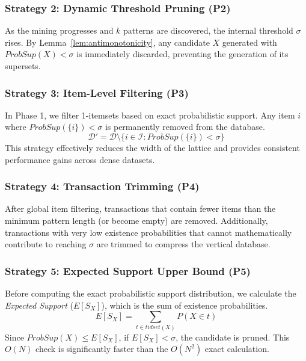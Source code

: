 \documentclass[10pt,letterpaper]{article}
\begin{document}
\subsubsection*{Strategy 2: Dynamic Threshold Pruning (P2)}
As the mining progresses and $k$ patterns are discovered, the internal threshold $\sigma$ rises. By Lemma~\ref{lem:antimonotonicity}, any candidate $X$ generated with $\mathit{ProbSup}(X) < \sigma$ is immediately discarded, preventing the generation of its supersets.

\subsubsection*{Strategy 3: Item-Level Filtering (P3)}
In Phase 1, we filter 1-itemsets based on exact probabilistic support. Any item $i$ where $\mathit{ProbSup}(\{i\}) < \sigma$ is permanently removed from the database.
\begin{equation}
\mathcal{D}' = \mathcal{D} \setminus \{i \in \mathcal{I} : \mathit{ProbSup}(\{i\}) < \sigma\}
\end{equation}
This strategy effectively reduces the width of the lattice and provides consistent performance gains across dense datasets.

\subsubsection*{Strategy 4: Transaction Trimming (P4)}
After global item filtering, transactions that contain fewer items than the minimum pattern length (or become empty) are removed. Additionally, transactions with very low existence probabilities that cannot mathematically contribute to reaching $\sigma$ are trimmed to compress the vertical database.

\subsubsection*{Strategy 5: Expected Support Upper Bound (P5)}
Before computing the exact probabilistic support distribution, we calculate the \textit{Expected Support} ($E[S_X]$), which is the sum of existence probabilities.
\begin{equation}
E[S_X] = \sum_{t \in \mathit{tidset}(X)} P(X \in t)
\end{equation}
Since $ProbSup(X) \leq E[S_X]$, if $E[S_X] < \sigma$, the candidate is pruned. This $O(N)$ check is significantly faster than the $O(N^2)$ exact calculation.
\end{document}
